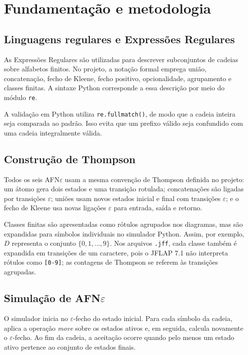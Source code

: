\chapter{Fundamentação e metodologia}

\section{Linguagens regulares e Expressões Regulares}

As Expressões Regulares são utilizadas para descrever subconjuntos de cadeias sobre alfabetos finitos. No projeto, a notação formal emprega união, concatenação, fecho de Kleene, fecho positivo, opcionalidade, agrupamento e classes finitas. A sintaxe Python corresponde a essa descrição por meio do módulo \texttt{re}.

A validação em Python utiliza \texttt{re.fullmatch()}, de modo que a cadeia inteira seja comparada ao padrão. Isso evita que um prefixo válido seja confundido com uma cadeia integralmente válida.

\section{Construção de Thompson}

Todos os seis AFN$\varepsilon$ usam a mesma convenção de Thompson definida no projeto: um átomo gera dois estados e uma transição rotulada; concatenações são ligadas por transições $\varepsilon$; uniões usam novos estados inicial e final com transições $\varepsilon$; e o fecho de Kleene usa novas ligações $\varepsilon$ para entrada, saída e retorno.

Classes finitas são apresentadas como rótulos agrupados nos diagramas, mas são expandidas para símbolos individuais no simulador Python. Assim, por exemplo, $D$ representa o conjunto $\{0,1,\ldots,9\}$. Nos arquivos \texttt{.jff}, cada classe também é expandida em transições de um caractere, pois o JFLAP 7.1 não interpreta rótulos como \texttt{[0-9]}; as contagens de Thompson se referem às transições agrupadas.

\section{\texorpdfstring{Simulação de AFN$\varepsilon$}{Simulação de AFN epsilon}}

O simulador inicia no $\varepsilon$-fecho do estado inicial. Para cada símbolo da cadeia, aplica a operação \textit{move} sobre os estados ativos e, em seguida, calcula novamente o $\varepsilon$-fecho. Ao fim da cadeia, a aceitação ocorre quando pelo menos um estado ativo pertence ao conjunto de estados finais.

